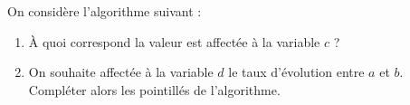 \documentclass[10pt,openright,twoside,french]{book}
\begin{document}

On considère l'algorithme suivant :

\begin{center}
\small
\end{center}

\begin{enumerate}
    \item À quoi correspond la valeur est affectée à la variable $c$ ?
    \item On souhaite affectée à la variable $d$ le taux d'évolution entre $a$ et $b$. Compléter alors les pointillés de l'algorithme.
\end{enumerate}
\end{document}
